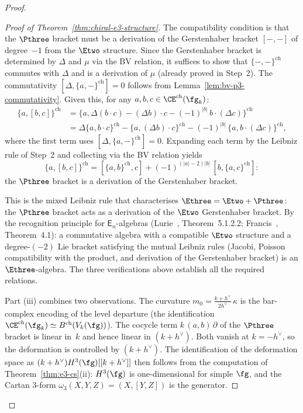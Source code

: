 \begin{proof}
\begin{proof}[Proof of Theorem~\ref{thm:chiral-e3-structure}]
The compatibility condition is that the $\Pthree$ bracket
must be a derivation of the Gerstenhaber bracket
$[-,-]$ of degree~$-1$ from the $\Etwo$ structure.
Since the Gerstenhaber bracket is determined by $\Delta$
and $\mu$ via the BV relation, it suffices to show that
$\{-,-\}^{\mathrm{ch}}$ commutes with $\Delta$ and is a
derivation of $\mu$ (already proved in Step~2). The
commutativity $[\Delta, \{a,-\}^{\mathrm{ch}}] = 0$
follows from Lemma~\ref{lem:bv-p3-commutativity}.
Given this, for any $a, b, c \in
\CE^{\mathrm{ch}}(\fg_k)$:
\begin{align*}
  \{a, [b, c]\}^{\mathrm{ch}}
  &= \{a, \Delta(b \cdot c)
  - (\Delta b) \cdot c
  - (-1)^{|b|}\,b \cdot (\Delta c)\}^{\mathrm{ch}} \\
  &= \Delta\{a, b \cdot c\}^{\mathrm{ch}}
  - \{a, (\Delta b) \cdot c\}^{\mathrm{ch}}
  - (-1)^{|b|}\,\{a, b \cdot (\Delta c)\}^{\mathrm{ch}},
\end{align*}
where the first term uses
$[\Delta, \{a,-\}^{\mathrm{ch}}] = 0$. Expanding each
term by the Leibniz rule of Step~2 and collecting via the
BV relation yields
\[
  \{a, [b, c]\}^{\mathrm{ch}}
  = [\{a, b\}^{\mathrm{ch}}, c]
  + (-1)^{(|a|-2)|b|}\,[b, \{a, c\}^{\mathrm{ch}}]:
\]
the $\Pthree$ bracket is a derivation of the
Gerstenhaber bracket.

This is the mixed Leibniz rule that characterises
$\Ethree = \Etwo + \Pthree$: the $\Pthree$ bracket acts
as a derivation of the $\Etwo$ Gerstenhaber bracket. By
the recognition principle for $\mathsf{E}_n$-algebras
(Lurie~\cite{HA}, Theorem~5.1.2.2;
Francis~\cite{Francis2013}, Theorem~4.1): a commutative
algebra with a compatible $\Etwo$ structure and a
degree-$(-2)$ Lie bracket satisfying the mutual Leibniz
rules (Jacobi, Poisson compatibility with the product, and
derivation of the Gerstenhaber bracket) is an
$\Ethree$-algebra. The three verifications above establish
all the required relations.

Part (iii) combines two observations. The curvature
$m_0 = \tfrac{k + h^\vee}{2h^\vee}\,\kappa$ is the bar-complex
encoding of the level departure (the identification
$\CE^{\mathrm{ch}}(\fg_k) \simeq B^{\mathrm{ch}}(V_k(\fg))$).
The cocycle term
$k\,(a,b)\,\partial$ of the $\Pthree$ bracket is linear
in~$k$ and hence linear in $(k + h^\vee)$.
Both vanish at $k = -h^\vee$, so the
deformation is controlled by $(k + h^\vee)$. The identification
of the deformation space as $(k+h^\vee) H^3(\fg)[[k+h^\vee]]$
then follows from the computation of
Theorem~\ref{thm:e3-cs}(ii): $H^3(\fg)$ is one-dimensional
for simple $\fg$, and the Cartan $3$-form
$\omega_3(X, Y, Z) = (X, [Y,Z])$ is the generator.


\end{proof}
\end{proof}
